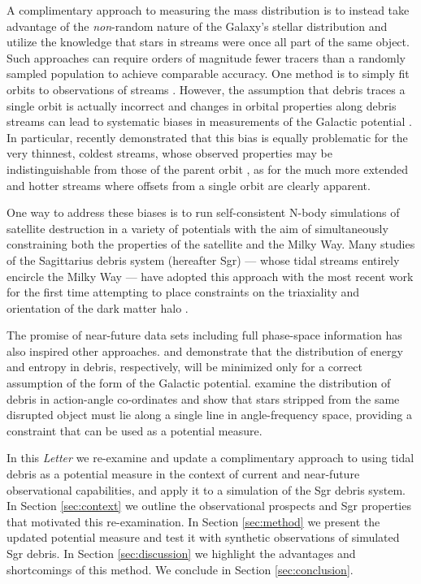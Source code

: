 \documentclass{emulateapj}
\begin{document}
A complimentary approach to measuring the mass distribution is to instead take advantage of the {\it non}-random nature of the Galaxy's stellar distribution and utilize the knowledge that stars in streams were once all part of the same object.
Such approaches can require orders of magnitude fewer tracers than a randomly sampled population to achieve comparable accuracy.
One method is to simply fit orbits to observations of streams 
\citep[e.g.,][]{koposov10}.
However, the assumption that debris traces a single orbit is actually incorrect \citep[see][]{johnston98,helmi99} and
changes in orbital properties along debris streams can lead to systematic biases in measurements of the Galactic potential \citep{eyre09a,varghese11}.
In particular, \citet{sanders13a} recently demonstrated that this bias is equally problematic for the very thinnest, coldest streams, whose observed properties may be indistinguishable from those of the parent orbit \citep[e.g. such as the globular cluster, GD1 --- see][]{koposov10}, as for the much more extended and hotter streams \citep[e.g. such as debris from the Sagittarius dwarf galaxy --- see][]{majewski03} where offsets from a single orbit are clearly apparent.

One way to address these biases is to run self-consistent N-body simulations of satellite destruction in a variety of potentials with the aim of simultaneously constraining both the properties of the satellite and the Milky Way.
Many studies of the Sagittarius debris system (hereafter Sgr) --- whose tidal streams entirely encircle the Milky Way --- have adopted this approach 
with the most recent work for the first time attempting to place constraints on the triaxiality and orientation of the dark matter halo
\citep{law10}.

The promise of near-future data sets including full phase-space information has also inspired other approaches. \citet{binney08} and \citet{penarrubia12} demonstrate that the distribution of energy and entropy in debris, respectively, will be minimized only for a correct
assumption of the form of the Galactic potential.
\citet{sanders13b} examine the distribution of debris in action-angle co-ordinates and show that stars stripped from the same disrupted object must lie along a single line in angle-frequency space, providing a constraint that can be used as a potential measure.

In this \emph{Letter} we re-examine and update a complimentary approach to using tidal debris as a potential measure \citep[originally proposed by][]{johnston99a}  in the context of current and near-future observational capabilities, and apply it to a simulation of the Sgr debris system.
In Section \ref{sec:context} we outline the observational prospects and Sgr properties that motivated this re-examination.
In Section \ref{sec:method} we present the updated potential measure and test it with synthetic observations of simulated Sgr debris.
In Section \ref{sec:discussion} we highlight the advantages and shortcomings of this method.
We conclude in Section \ref{sec:conclusion}.
\end{document}
